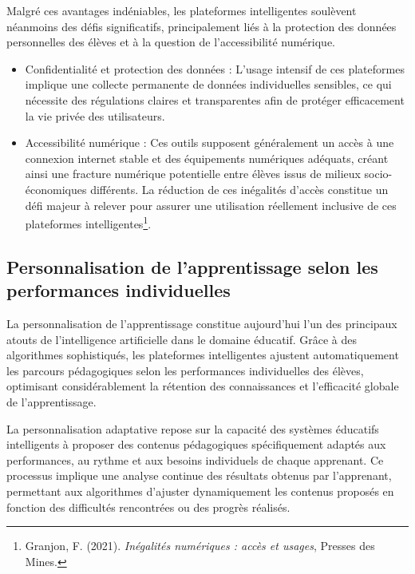 \documentclass[11pt,a4paper]{report}
\begin{document}
Malgré ces avantages indéniables, les plateformes intelligentes soulèvent néanmoins des défis significatifs, principalement liés à la protection des données personnelles des élèves et à la question de l’accessibilité numérique.

\begin{itemize}

    \item Confidentialité et protection des données :
L’usage intensif de ces plateformes implique une collecte permanente de données individuelles sensibles, ce qui nécessite des régulations claires et transparentes afin de protéger efficacement la vie privée des utilisateurs.

    \item Accessibilité numérique :
Ces outils supposent généralement un accès à une connexion internet stable et des équipements numériques adéquats, créant ainsi une fracture numérique potentielle entre élèves issus de milieux socio-économiques différents. La réduction de ces inégalités d’accès constitue un défi majeur à relever pour assurer une utilisation réellement inclusive de ces plateformes intelligentes\footnote{Granjon, F. (2021). \textit{Inégalités numériques : accès et usages}, Presses des Mines.}.

\end{itemize}

\subsection{Personnalisation de l’apprentissage selon les performances individuelles}

La personnalisation de l’apprentissage constitue aujourd’hui l’un des principaux atouts de l’intelligence artificielle dans le domaine éducatif. Grâce à des algorithmes sophistiqués, les plateformes intelligentes ajustent automatiquement les parcours pédagogiques selon les performances individuelles des élèves, optimisant considérablement la rétention des connaissances et l’efficacité globale de l’apprentissage.

La personnalisation adaptative repose sur la capacité des systèmes éducatifs intelligents à proposer des contenus pédagogiques spécifiquement adaptés aux performances, au rythme et aux besoins individuels de chaque apprenant. Ce processus implique une analyse continue des résultats obtenus par l’apprenant, permettant aux algorithmes d’ajuster dynamiquement les contenus proposés en fonction des difficultés rencontrées ou des progrès réalisés.
\end{document}
